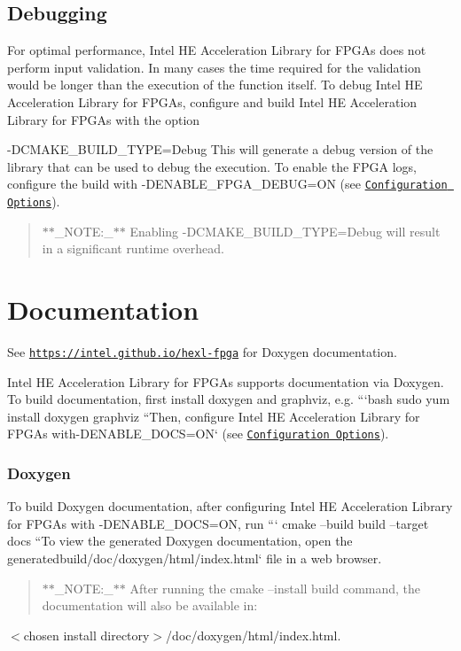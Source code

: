 \subsection*{Debugging}

For optimal performance, Intel H\-E Acceleration Library for F\-P\-G\-As does not perform input validation. In many cases the time required for the validation would be longer than the execution of the function itself. To debug Intel H\-E Acceleration Library for F\-P\-G\-As, configure and build Intel H\-E Acceleration Library for F\-P\-G\-As with the option \par
 {\ttfamily -\/\-D\-C\-M\-A\-K\-E\-\_\-\-B\-U\-I\-L\-D\-\_\-\-T\-Y\-P\-E=Debug} This will generate a debug version of the library that can be used to debug the execution. To enable the F\-P\-G\-A logs, configure the build with {\ttfamily -\/\-D\-E\-N\-A\-B\-L\-E\-\_\-\-F\-P\-G\-A\-\_\-\-D\-E\-B\-U\-G=O\-N} (see \href{#configuration-options}{\tt Configuration Options}). \par


\begin{quotation}
$\ast$$\ast$\-\_\-\-N\-O\-T\-E\-:\-\_\-$\ast$$\ast$ Enabling {\ttfamily -\/\-D\-C\-M\-A\-K\-E\-\_\-\-B\-U\-I\-L\-D\-\_\-\-T\-Y\-P\-E=Debug} will result in a significant runtime overhead. \par


\end{quotation}


\section*{Documentation}

See \href{https://intel.github.io/hexl-fpga}{\tt https\-://intel.\-github.\-io/hexl-\/fpga} for Doxygen documentation. \par


Intel H\-E Acceleration Library for F\-P\-G\-As supports documentation via Doxygen. To build documentation, first install {\ttfamily doxygen} and {\ttfamily graphviz}, e.\-g. ```bash sudo yum install doxygen graphviz ``{\ttfamily  Then, configure Intel H\-E Acceleration Library for F\-P\-G\-As with}-\/\-D\-E\-N\-A\-B\-L\-E\-\_\-\-D\-O\-C\-S=O\-N` (see \href{#configuration-options}{\tt Configuration Options}). \subsubsection*{Doxygen}

To build Doxygen documentation, after configuring Intel H\-E Acceleration Library for F\-P\-G\-As with {\ttfamily -\/\-D\-E\-N\-A\-B\-L\-E\-\_\-\-D\-O\-C\-S=O\-N}, run ``` cmake --build build --target docs ``{\ttfamily  To view the generated Doxygen documentation, open the generated}build/doc/doxygen/html/index.\-html` file in a web browser. \begin{quotation}
$\ast$$\ast$\-\_\-\-N\-O\-T\-E\-:\-\_\-$\ast$$\ast$ After running the cmake --install build command, the documentation will also be available in\-: \par


\end{quotation}
{\ttfamily $<$chosen install directory$>$/doc/doxygen/html/index.html}.

